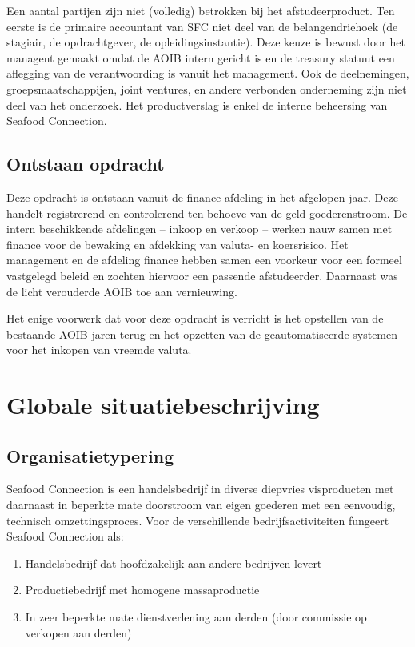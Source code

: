 \documentclass[10pt,a4paper,twoside]{report}
\begin{document}
Een aantal partijen zijn niet (volledig) betrokken bij het afstudeerproduct. Ten eerste is de primaire accountant van SFC niet deel van de belangendriehoek (de stagiair, de opdrachtgever, de opleidingsinstantie). Deze keuze is bewust door het managent gemaakt omdat de AOIB intern gericht is en de treasury statuut een aflegging van de verantwoording is vanuit het management. 
Ook de deelnemingen, groepsmaatschappijen, joint ventures, en andere verbonden onderneming zijn niet deel van het onderzoek. Het productverslag is enkel de interne beheersing van Seafood Connection.

\section{Ontstaan opdracht}
Deze opdracht is ontstaan vanuit de finance afdeling in het afgelopen jaar. Deze handelt registrerend en controlerend ten behoeve van de geld-goederenstroom. De intern beschikkende afdelingen – inkoop en verkoop – werken nauw samen met finance voor de bewaking en afdekking van valuta- en koersrisico. Het management en de afdeling finance hebben samen een voorkeur voor een formeel vastgelegd beleid en zochten hiervoor een passende afstudeerder. Daarnaast was de licht verouderde AOIB toe aan vernieuwing.

Het enige voorwerk dat voor deze opdracht is verricht is het opstellen van de bestaande AOIB jaren terug en het opzetten van de geautomatiseerde systemen voor het inkopen van vreemde valuta.

\chapter{Globale situatiebeschrijving}
\section{Organisatietypering}
Seafood Connection is een handelsbedrijf in diverse diepvries visproducten met daarnaast in beperkte mate doorstroom van eigen goederen met een eenvoudig, technisch omzettingsproces. 
Voor de verschillende bedrijfsactiviteiten fungeert Seafood Connection als:

\begin{enumerate}
    \item Handelsbedrijf dat hoofdzakelijk aan andere bedrijven levert
    \item Productiebedrijf met homogene massaproductie
    \item In zeer beperkte mate dienstverlening aan derden (door commissie op verkopen aan derden)
\end{enumerate}
\citep{aoibsfc}
\end{document}
